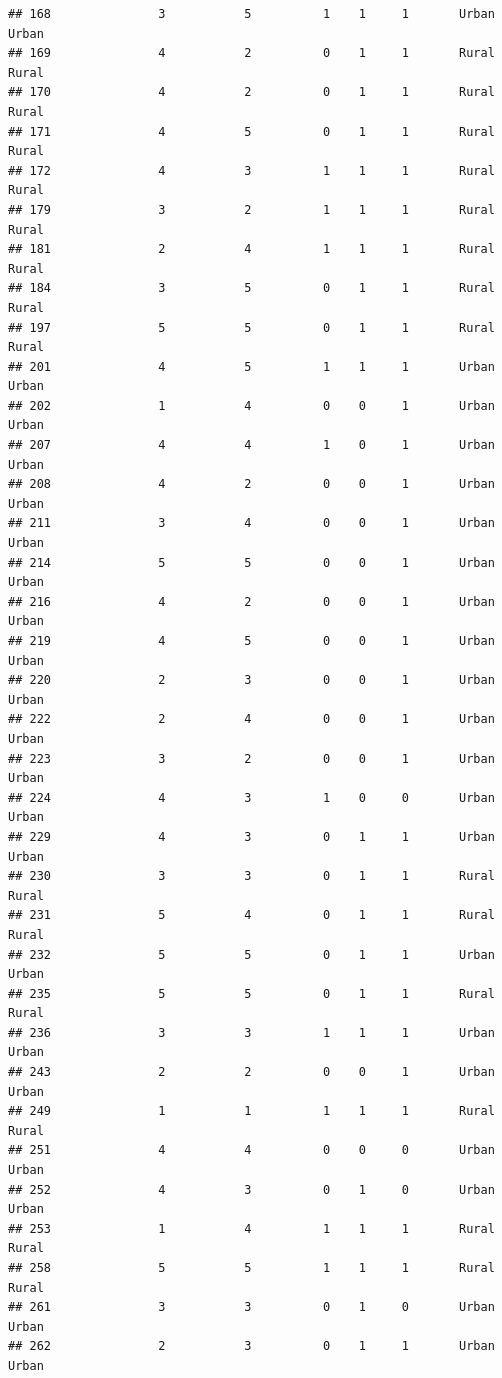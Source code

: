\documentclass[
]{article}
\begin{document}
\begin{verbatim}
## 168               3           5          1    1     1       Urban Urban
## 169               4           2          0    1     1       Rural Rural
## 170               4           2          0    1     1       Rural Rural
## 171               4           5          0    1     1       Rural Rural
## 172               4           3          1    1     1       Rural Rural
## 179               3           2          1    1     1       Rural Rural
## 181               2           4          1    1     1       Rural Rural
## 184               3           5          0    1     1       Rural Rural
## 197               5           5          0    1     1       Rural Rural
## 201               4           5          1    1     1       Urban Urban
## 202               1           4          0    0     1       Urban Urban
## 207               4           4          1    0     1       Urban Urban
## 208               4           2          0    0     1       Urban Urban
## 211               3           4          0    0     1       Urban Urban
## 214               5           5          0    0     1       Urban Urban
## 216               4           2          0    0     1       Urban Urban
## 219               4           5          0    0     1       Urban Urban
## 220               2           3          0    0     1       Urban Urban
## 222               2           4          0    0     1       Urban Urban
## 223               3           2          0    0     1       Urban Urban
## 224               4           3          1    0     0       Urban Urban
## 229               4           3          0    1     1       Urban Urban
## 230               3           3          0    1     1       Rural Rural
## 231               5           4          0    1     1       Rural Rural
## 232               5           5          0    1     1       Urban Urban
## 235               5           5          0    1     1       Rural Rural
## 236               3           3          1    1     1       Urban Urban
## 243               2           2          0    0     1       Urban Urban
## 249               1           1          1    1     1       Rural Rural
## 251               4           4          0    0     0       Urban Urban
## 252               4           3          0    1     0       Urban Urban
## 253               1           4          1    1     1       Rural Rural
## 258               5           5          1    1     1       Rural Rural
## 261               3           3          0    1     0       Urban Urban
## 262               2           3          0    1     1       Urban Urban

\end{verbatim}
\end{document}
